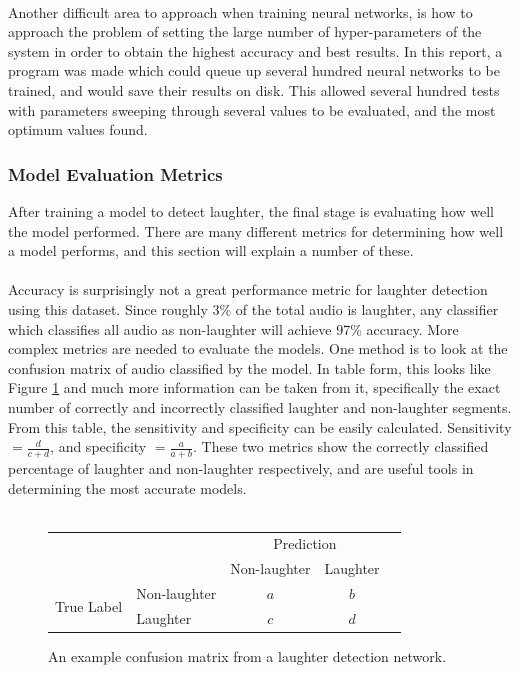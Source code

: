 \documentclass[a4paper,11pt,notitlepage]{article}
\begin{document}
\\
Another difficult area to approach when training neural networks, is how to approach the problem of setting the large number of hyper-parameters of the system in order to obtain the highest accuracy and best results. In this report, a program was made which could queue up several hundred neural networks to be trained, and would save their results on disk. This allowed several hundred tests with parameters sweeping through several values to be evaluated, and the most optimum values found.

\newpage
\subsubsection{Model Evaluation Metrics}

					
After training a model to detect laughter, the final stage is evaluating how well the model performed. There are many different metrics for determining how well a model performs, and this section will explain a number of these.\\
\\
Accuracy is surprisingly not a great performance metric for laughter detection using this dataset. Since roughly 3\% of the total audio is laughter, any classifier which classifies all audio as non-laughter will achieve 97\% accuracy. More complex metrics are needed to evaluate the models. One method is to look at the confusion matrix of audio classified by the model. In table form, this looks like Figure \ref{example_confusion_matrix} and much more information can be taken from it, specifically the exact number of correctly and incorrectly classified laughter and non-laughter segments. From this table, the sensitivity and specificity can be easily calculated. Sensitivity $= \frac{d}{c + d}$, and specificity $= \frac{a}{a + b}$. These two metrics show the correctly classified percentage of laughter and non-laughter respectively, and are useful tools in determining the most accurate models.\\
\\

\begin{figure}
\centering
\begin{tabular}{l|l|c|c|c}
\multicolumn{2}{c}{}&\multicolumn{2}{c}{Prediction}&\\
\cline{3-4}
\multicolumn{2}{c|}{}&Non-laughter&Laughter\\
\cline{2-4}
\multirow{2}{*}{True Label}& Non-laughter & $a$ & $b$\\
\cline{2-4}
& Laughter & $c$ & $d$\\
\cline{2-4}
\end{tabular}
\label{example_confusion_matrix}
\caption{An example confusion matrix from a laughter detection network.}
\end{figure}
\end{document}
